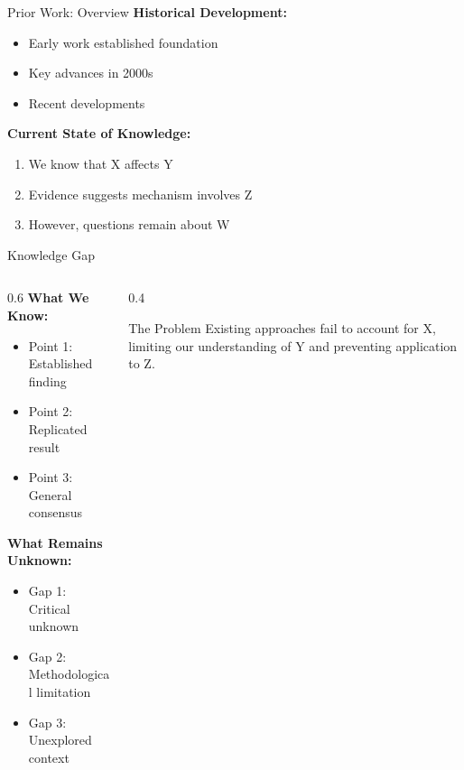 \documentclass[aspectratio=169,11pt]{beamer}
\begin{document}
\begin{frame}{Prior Work: Overview}
  \textbf{Historical Development:}
  \begin{itemize}
    \item Early work established foundation \cite{seminal1990}
    \item Key advances in 2000s \cite{advance2005,advance2007}
    \item Recent developments \cite{recent2020,recent2022}
  \end{itemize}

  \vspace{0.5cm}

  \textbf{Current State of Knowledge:}
  \begin{enumerate}
    \item We know that X affects Y
    \item Evidence suggests mechanism involves Z
    \item However, questions remain about W
  \end{enumerate}
\end{frame}

\begin{frame}{Knowledge Gap}
  \begin{columns}[c]

    \begin{column}{0.6\textwidth}
      \textbf{What We Know:}
      \begin{itemize}
        \item Point 1: Established finding
        \item Point 2: Replicated result
        \item Point 3: General consensus
      \end{itemize}

      \vspace{0.5cm}

      \textbf{What Remains Unknown:}
      \begin{itemize}
        \item \alert{Gap 1:} Critical unknown
        \item \alert{Gap 2:} Methodological limitation
        \item \alert{Gap 3:} Unexplored context
      \end{itemize}
    \end{column}

    \begin{column}{0.4\textwidth}
      \begin{alertblock}{The Problem}
        Existing approaches fail to account for X, limiting our understanding of Y and preventing application to Z.
      \end{alertblock}
    \end{column}

  \end{columns}
\end{frame}
\end{document}
